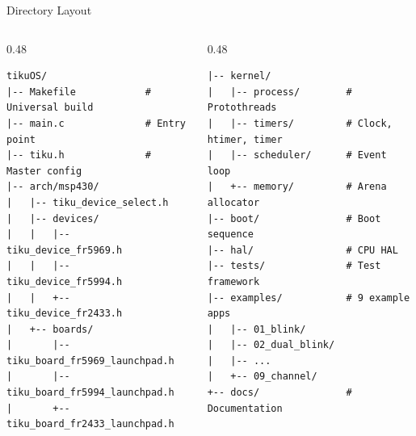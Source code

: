 \documentclass[aspectratio=169, 10pt]{beamer}
\begin{document}
\begin{frame}[fragile]{Directory Layout}
\begin{columns}[T]
\begin{column}{0.48\textwidth}
\begin{lstlisting}[basicstyle=\ttfamily\tiny, frame=none]
tikuOS/
|-- Makefile            # Universal build
|-- main.c              # Entry point
|-- tiku.h              # Master config
|-- arch/msp430/
|   |-- tiku_device_select.h
|   |-- devices/
|   |   |-- tiku_device_fr5969.h
|   |   |-- tiku_device_fr5994.h
|   |   +-- tiku_device_fr2433.h
|   +-- boards/
|       |-- tiku_board_fr5969_launchpad.h
|       |-- tiku_board_fr5994_launchpad.h
|       +-- tiku_board_fr2433_launchpad.h
\end{lstlisting}
\end{column}
\begin{column}{0.48\textwidth}
\begin{lstlisting}[basicstyle=\ttfamily\tiny, frame=none]
|-- kernel/
|   |-- process/        # Protothreads
|   |-- timers/         # Clock, htimer, timer
|   |-- scheduler/      # Event loop
|   +-- memory/         # Arena allocator
|-- boot/               # Boot sequence
|-- hal/                # CPU HAL
|-- tests/              # Test framework
|-- examples/           # 9 example apps
|   |-- 01_blink/
|   |-- 02_dual_blink/
|   |-- ...
|   +-- 09_channel/
+-- docs/               # Documentation
\end{lstlisting}
\end{column}
\end{columns}
\end{frame}
\end{document}
